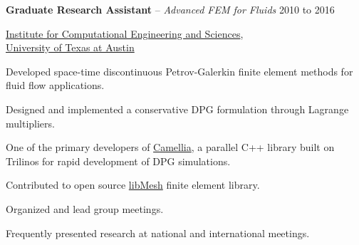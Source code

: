 \documentclass[10pt]{article}
\newenvironment{innerlist}[1][\enskip\textbullet]%
        {\begin{compactitem}[#1]}{\end{compactitem}}
\begin{document}
\textbf{Graduate Research Assistant} -- \emph{Advanced FEM for Fluids} \hfill {2010 to 2016}
\begin{innerlist}

\item[] \href{http://ices.utexas.edu/}{Institute for Computational Engineering
and Sciences},\\
        \href{http://www.utexas.edu/}{University of Texas at Austin}
\begin{innerlist}
\item Developed space-time discontinuous Petrov-Galerkin finite element methods for
fluid flow applications.
\item Designed and implemented a conservative DPG formulation through Lagrange multipliers.
\item One of the primary developers of
\href{https://github.com/CamelliaDPG/Camellia}{Camellia}, a parallel C++ library built on Trilinos for
rapid development of DPG simulations.
\item Contributed to open source \href{http://libmesh.github.io/}{libMesh} finite element library.
\item Organized and lead group meetings.
\item Frequently presented research at national and international meetings.
\end{innerlist}
\end{innerlist}

\bigskip
\end{document}
